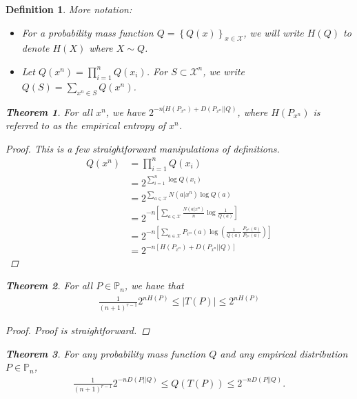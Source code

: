 \documentclass[13pt]{article}
\newtheorem*{theorem}{Theorem}
\newtheorem*{definition}{Definition}
\def\XX{\mathcal{X}}
\def\PP{\mathbb{P}}
\begin{document}
\begin{definition}
More notation:

\begin{itemize}
  \item For a probability mass function $Q = \left\{ Q(x) \right\}_{x \in \XX}$, we will write $H(Q)$ to denote $H(X)$ where $X \sim Q$.
  \item Let $Q(x^n) = \prod_{i=1}^{n} Q(x_i)$.  For $S \subset \XX^n$, we write $Q(S) = \sum_{x^n \in S} Q(x^n)$.
\end{itemize}

\begin{theorem}
  For all $x^n$, we have $2^{-n [H(P_{x^n}) + D(P_{x^n} || Q)}$, where $H(P_{x^n})$ is referred to as the empirical entropy of $x^n$.
\end{theorem}

\begin{proof}
  This is a few straightforward manipulations of definitions.
  \begin{align*}
    Q(x^n) &= \prod_{i=1}^{n} Q(x_i) \\
    &= 2^{\sum_{i=1}^{n} \log Q(x_i)} \\
    &= 2^{\sum_{a \in \XX} N(a | x^n) \log Q(a)} \\
    &= 2^{-n [ \sum_{a \in \XX} \frac{N(a | x^n)}{n} \log \frac{1}{Q(a)}]} \\
    &= 2^{-n \left[ \sum_{a \in \XX} P_{x^n} (a) \log \left( \frac{1}{Q(a)} \frac{P_{x^n}(a)}{P_{x^n}(a)} \right)\right]} \\
    &= 2^{-n \left[ H(P_{x^n}) + D(P_{x^n} || Q) \right]}
  \end{align*}
\end{proof} 

\begin{theorem}
  For all $P \in \PP_n$, we have that
  \begin{align*}
    \frac{1}{(n+1)^{r-1}} 2^{n H(P)} \leq |T(P)| \leq 2^{n H(P)}
  \end{align*}
\end{theorem}

\begin{proof}
  Proof is straightforward. 
\end{proof}

\begin{theorem}
  For any probability mass function $Q$ and any empirical distribution $P \in \PP_n$,
\begin{align*}
  \frac{1}{(n+1)^{r-1}}  2^{-n D(P || Q)}  \leq Q(T(P)) \leq 2^{-n D(P || Q)}.
\end{align*}


\end{theorem}
\end{definition}
\end{document}
